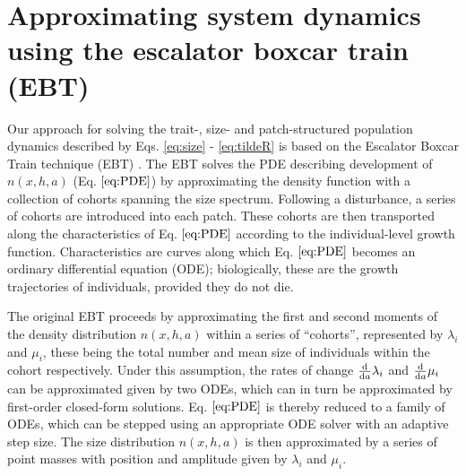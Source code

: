 \documentclass[10pt,twoside]{article}
\begin{document}
\section{Approximating system dynamics using the escalator boxcar train
(EBT)}\label{approximating-system-dynamics-using-the-escalator-boxcar-train-ebt}

Our approach for solving the trait-, size- and patch-structured
population dynamics described by Eqs. \ref{eq:size} - \ref{eq:tildeR} is
based on the Escalator Boxcar Train technique (EBT)
\citep{Deroos-1997, Deroos-1992, Deroos-1988}. The EBT solves the PDE
describing development of \(n(x,h,a)\) (Eq. \(\ref{eq:PDE}\)) by
approximating the density function with a collection of cohorts spanning
the size spectrum. Following a disturbance, a series of cohorts are
introduced into each patch. These cohorts are then transported along the
characteristics of Eq. \(\ref{eq:PDE}\) according to the
individual-level growth function. Characteristics are curves along which
Eq. \(\ref{eq:PDE}\) becomes an ordinary differential equation (ODE);
biologically, these are the growth trajectories of individuals, provided
they do not die.

The original EBT \citep{Deroos-1997, Deroos-1992, Deroos-1988} proceeds
by approximating the first and second moments of the density
distribution \(n \left( x,h,a \right)\) within a series of ``cohorts'',
represented by \(\lambda_i\) and \(\mu_i\), these being the total number
and mean size of individuals within the cohort respectively. Under this
assumption, the rates of change \(\frac{\rm d} {{\rm d}a} \lambda_i\)
and \(\frac{\rm d} {{\rm d}a} \mu_i\) can be approximated given by two
ODEs, which can in turn be approximated by first-order closed-form
solutions. Eq. \(\ref{eq:PDE}\) is thereby reduced to a family of ODEs,
which can be stepped using an appropriate ODE solver with an adaptive
step size. The size distribution \(n(x,h,a)\) is then approximated by a
series of point masses with position and amplitude given by
\(\lambda_i\) and \(\mu_i\).
\end{document}
